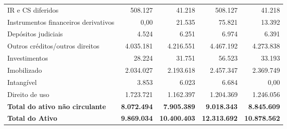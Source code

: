 \documentclass[1pt,a4paper]{article}
\begin{document}
\begin{longtable}{p{6cm}r r r r }
			IR e CS diferidos & 508.127 & 41.218 & 508.127 & 41.218 \\
			Instrumentos financeiros derivativos & 0,00 & 21.535 & 75.821 & 13.392 \\
			Depósitos judiciais & 4.524 & 6.251 & 6.974 & 6.391 \\
			Outros créditos/outros direitos & 4.035.181 & 4.216.551 & 4.467.192 & 4.273.838 \\
			Investimentos & 28.224 & 31.751 & 56.523 & 33.193 \\
			Imobilizado & 2.034.027 & 2.193.618 & 2.457.347 & 2.369.749 \\
			Intangível & 3.853 & 6.023 & 6.684 & 0,00 \\
			Direito de uso & 1.723.721 & 1.162.397 & 1.204.369 & 1.246.056 \\
			\rowcolor{darkgray}\textbf{Total do ativo não circulante} & \textbf{8.072.494} & \textbf{7.905.389} & \textbf{9.018.343} & \textbf{8.845.609} \\
			\midrule
			\rowcolor{darkgray}\textbf{Total do Ativo} & \textbf{9.869.034 } & \textbf{10.400.403} & \textbf{12.313.692} & \textbf{10.878.562} \\
			\bottomrule
		\end{longtable}
		
		
		
\end{document}
